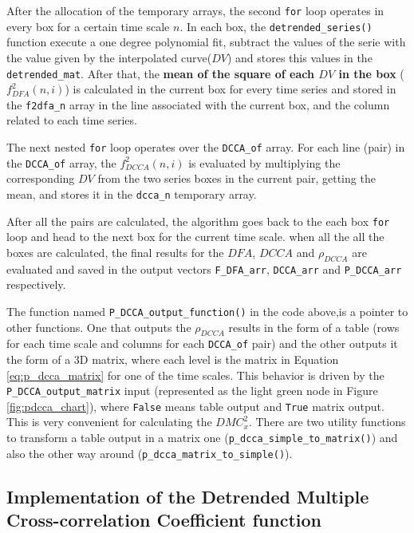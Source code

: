 \documentclass[article]{jss}
\begin{document}
After the allocation of the temporary arrays, the second \verb"for" loop operates in every box for a certain time scale $n$. In each box, the \verb"detrended_series()" function execute a one degree polynomial fit, subtract the values of the serie with the value given by the interpolated curve($DV$) and stores this values in the \verb"detrended_mat". After that, the \textbf{mean of the square of each $DV$ in the box} ($f_{DFA}^{2}(n, i)$) is calculated in the current box for every time series and stored in the \verb"f2dfa_n" array in the line associated with the current box, and the column related to each time series.

The next nested \verb"for" loop operates over the \verb"DCCA_of" array. For each line (pair) in the \verb"DCCA_of" array, the $f_{DCCA}^{2}(n, i)$ is evaluated by multiplying the corresponding $DV$ from the two series  boxes in the current pair, getting the mean, and stores it in the \verb"dcca_n" temporary array.

After all the pairs are calculated, the algorithm goes back to the each box \verb"for" loop and head to the next box for the current time scale. when all the all the boxes are calculated, the final results for the $DFA$, $DCCA$ and $\rho_{DCCA}$ are evaluated and saved in the output vectors \verb"F_DFA_arr", \verb"DCCA_arr" and \verb"P_DCCA_arr" respectively.

The function named \verb"P_DCCA_output_function()" in the code above,is a pointer to other functions. One that outputs the  $\rho_{DCCA}$ results in the form of a table (rows for each time scale and columns for each \verb"DCCA_of" pair) and the other outputs it the form of a 3D matrix, where each level is the matrix in Equation \ref{eq:p_dcca_matrix} for one of the time scales. This behavior is driven by the \verb"P_DCCA_output_matrix" input (represented as the light green node in Figure \ref{fig:pdcca_chart}), where \verb"False" means table output and \verb"True" matrix output. This is very convenient for calculating the $DMC_x^2$. There are two utility functions to transform a table output in a matrix one (\verb"p_dcca_simple_to_matrix()") and also the other way around (\verb"p_dcca_matrix_to_simple()").

\subsection{Implementation of the Detrended Multiple Cross-correlation Coefficient function}
\end{document}
